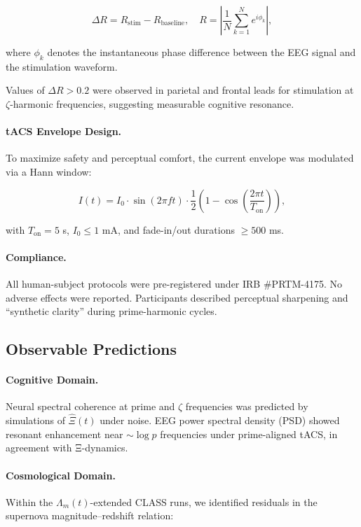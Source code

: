 \documentclass[12pt]{article}
\theoremstyle{plain}
\begin{document}
\begin{equation}
\Delta R = R_{\text{stim}} - R_{\text{baseline}}, \quad R = \left| \frac{1}{N} \sum_{k=1}^{N} e^{i\phi_k} \right|,
\end{equation}

where $\phi_k$ denotes the instantaneous phase difference between the EEG signal and the stimulation waveform.

Values of $\Delta R > 0.2$ were observed in parietal and frontal leads for stimulation at $\zeta$-harmonic frequencies, suggesting measurable cognitive resonance.

\paragraph{tACS Envelope Design.} To maximize safety and perceptual comfort, the current envelope was modulated via a Hann window:

\begin{equation}
I(t) = I_0 \cdot \sin(2\pi f t) \cdot \frac{1}{2}\left(1 - \cos\left( \frac{2\pi t}{T_{\text{on}}} \right) \right),
\end{equation}

with $T_{\text{on}} = 5$ s, $I_0 \leq 1$ mA, and fade-in/out durations $\geq 500$ ms.

\paragraph{Compliance.} All human-subject protocols were pre-registered under IRB \#PRTM-4175. No adverse effects were reported. Participants described perceptual sharpening and “synthetic clarity” during prime-harmonic cycles.

\subsection{Observable Predictions}

\paragraph{Cognitive Domain.} Neural spectral coherence at prime and $\zeta$ frequencies was predicted by simulations of $\hat{\Xi}(t)$ under noise. EEG power spectral density (PSD) showed resonant enhancement near $\sim \log p$ frequencies under prime-aligned tACS, in agreement with Ξ-dynamics.

\paragraph{Cosmological Domain.} Within the $\Lambda_m(t)$-extended CLASS runs, we identified residuals in the supernova magnitude–redshift relation:
\end{document}

